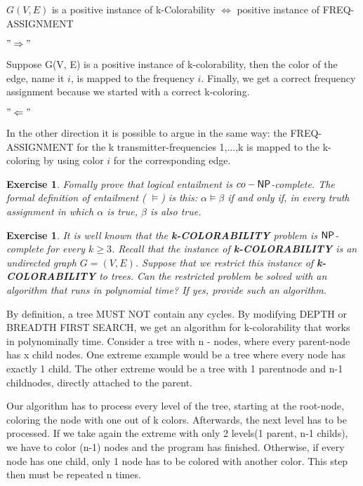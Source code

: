\documentclass [11pt]{article}
\newtheorem{exercise}[theorem]{Exercise}
\newcommand{\ccfont}[1]{\protect\mathsf{#1}}
\newcommand{\NP}{\ccfont{NP}}
\newcommand{\solution}[1]{\noindent {\bf Solution.}  #1}
\begin{document}
\medskip

 $G(V, E)$ is a positive instance of k-Colorability $\Leftrightarrow$ positive instance of FREQ-ASSIGNMENT

$ "\Rightarrow" $

Suppose G(V, E) is a positive instance of k-colorability, then the color of the edge, name it $i$, is mapped to the frequency $i$. Finally, we get a correct frequency assignment because we started with a correct k-coloring.

\medskip

$ "\Leftarrow" $

In the other direction it is possible to argue in the same way: the FREQ-ASSIGNMENT for the k transmitter-frequencies {1,...,k} is mapped to the k-coloring by using color $i$ for the corresponding edge.

\begin{exercise}
  \label{ex:CO-NP}
  Fomally prove that logical entailment is $co-\NP$-complete. The formal definition of entailment ( $\models$) is this: $\alpha \models \beta$ if and only if, in every truth assignment in which $\alpha$ is true, $\beta$ is also true.  
\end{exercise}





\begin{exercise}
  \label{ex:Colors}
  It is well known that the \textbf{k-COLORABILITY} problem is $\NP$-complete for every $k \geq 3$. Recall that the instance of \textbf{k-COLORABILITY} is an undirected graph $G = (V, E)$. Suppose that we restrict this instance of \textbf{k-COLORABILITY} to trees. Can the restricted problem be solved with an algorithm that runs in polynomial time? If yes, provide such an algorithm. 
\end{exercise}


\solution

By definition, a tree MUST NOT contain any cycles. By modifying DEPTH or BREADTH FIRST SEARCH, we get an algorithm for k-colorability that works in polynominally time. Consider a tree with n - nodes, where every parent-node has x child nodes. One extreme example would be a tree where every node has exactly 1 child. The other extreme would be a tree with 1 parentnode and n-1 childnodes, directly attached to the parent.

Our algorithm has to process every level of the tree, starting at the root-node, coloring the node with one out of k colors. Afterwards, the next level has to be processed. If we take again the extreme with only 2 levels(1 parent, n-1 childs), we have to color (n-1) nodes and the program has finished. Otherwise, if every node has one child, only 1 node has to be colored with another color. This step then must be repeated n times.
\end{document}
